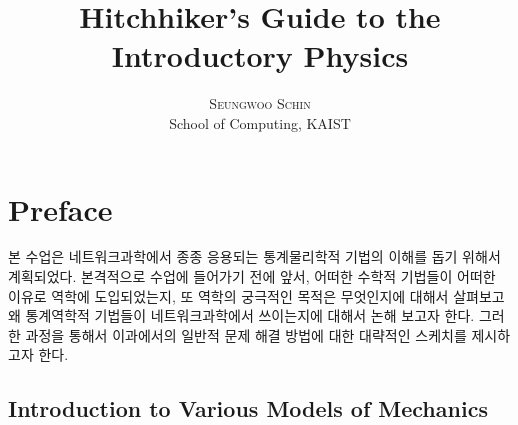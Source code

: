 \documentclass[titlepage]{article}
\title{\vspace{-15mm}\fontsize{24pt}{10pt}\selectfont\textbf{Hitchhiker's Guide to the\\ Introductory Physics}} %
\author{
\large
\textsc{Seungwoo Schin}\\[2mm]
\normalsize School of Computing, KAIST \\ %
\vspace{-5mm}
}
\date{}
\begin{document}


\begin{titlepage}
\maketitle %

\end{titlepage}



\thispagestyle{fancy} %

\tableofcontents

\newpage






\section{Preface}

본 수업은 네트워크과학에서 종종 응용되는 통계물리학적 기법의 이해를 돕기 위해서 계획되었다. 본격적으로 수업에 들어가기 전에 앞서, 어떠한 수학적 기법들이 어떠한 이유로 역학에 도입되었는지, 또 역학의 궁극적인 목적은 무엇인지에 대해서 살펴보고 왜 통계역학적 기법들이 네트워크과학에서 쓰이는지에 대해서 논해 보고자 한다. 그러한 과정을 통해서 이과에서의 일반적 문제 해결 방법에 대한 대략적인 스케치를 제시하고자 한다. 

\subsection{Introduction to Various Models of Mechanics} 
\end{document}
